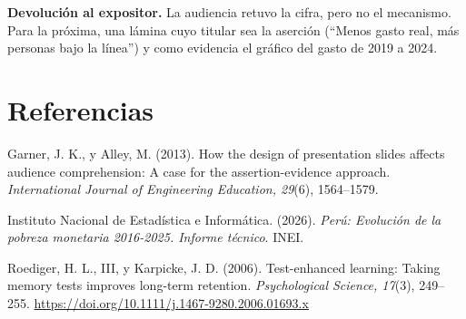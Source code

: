 \documentclass{academic-report}
\begin{document}
\textbf{Devolución al expositor.} La audiencia retuvo la cifra, pero no el mecanismo. Para la
próxima, una lámina cuyo titular sea la aserción (“Menos gasto real, más personas bajo la línea”)
y como evidencia el gráfico del gasto de 2019 a 2024.

\section*{Referencias}
{\setlength{\parindent}{0pt}
\hangindent=1.27cm
Garner, J. K., y Alley, M. (2013). How the design of presentation slides affects audience
comprehension: A case for the assertion-evidence approach. \textit{International Journal of
Engineering Education, 29}(6), 1564–1579.\par
\hangindent=1.27cm
Instituto Nacional de Estadística e Informática. (2026). \textit{Perú: Evolución de la pobreza
monetaria 2016-2025. Informe técnico}. INEI.\par
\hangindent=1.27cm
Roediger, H. L., III, y Karpicke, J. D. (2006). Test-enhanced learning: Taking memory tests
improves long-term retention. \textit{Psychological Science, 17}(3), 249–255.
\url{https://doi.org/10.1111/j.1467-9280.2006.01693.x}\par}
\end{document}
